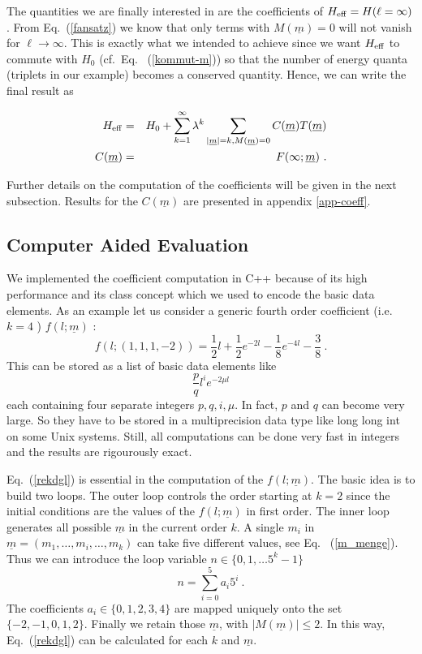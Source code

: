 The quantities we are finally interested in are the coefficients
of $H_{\rm eff}=H(\ell=\infty)$. From Eq.~(\ref{fansatz}) we know
that only terms with $M(\underline{m})=0$ will not vanish for
$\ell\to \infty$. This is exactly what we intended to achieve 
since we want $H_{\rm eff}$ to commute with $H_0$ (cf.~Eq.~
(\ref{kommut-m})) so that the
number of energy quanta (triplets in our example) becomes
a conserved quantity. Hence, we can write the final result as
\begin{mathletters}
\label{effhamilfin}
\begin{eqnarray}
H_{\rm eff} &=& H_0 +\sum_{k=1}^{\infty}\lambda^{k} 
\sum_{|\underline{m}|=k, M(\underline{m})=0} C(\underline{m}) 
T(\underline{m})\\
C(\underline{m}) &=& F(\infty;\underline{m})\ .
\end{eqnarray}
\end{mathletters}
Further details on the computation of the coefficients will be
given in the next subsection. Results for the $C(\underline{m})$
are presented in appendix \ref{app-coeff}.


\subsection{Computer Aided Evaluation}
We implemented the coefficient computation in C++ because of its high 
performance and its class concept which we used to encode the basic data 
elements. As an example let us
 consider a generic fourth order coefficient 
(i.e. $k=4$ ) $f(l;\underline{m})$ :
\begin{equation}
\label{fexample}
  f(l;(1,1,1,-2))=\frac{1}{2}l+\frac{1}{2}e^{-2l}-\frac{1}{8}e^{-4l}-
\frac{3}{8} \ .
\end{equation}
This can be stored as a list of basic data elements like
\begin{equation}
\label{basicdats}
 \frac{p}{q}l^ie^{-2\mu l}
\end{equation}
each containing four separate integers $p,q,i,\mu$. In fact, $p$ and $q$ 
can become very large. So they have to be stored in a multiprecision data 
type like long long int on some Unix systems. Still, all computations can 
be done very fast in integers and the results are rigourously exact.

Eq.~(\ref{rekdgl}) is essential in the computation of the $f(l;\underline{m})$.
 The basic idea is to build two loops. The outer loop controls the order 
starting at $k=2$ since the initial conditions are the values of the 
$f(l;\underline{m})$ in first order. The inner loop generates all possible 
$\underline{m}$ in the current order $k$. A single $m_i$ in 
$\underline{m}=(m_1,\ldots,m_i,\ldots,m_k)$ can take five different values,
see Eq.~ (\ref{m_menge}). Thus we can introduce the loop variable 
$n \in \{0,1,\ldots 5^k-1\}$ 
\begin{equation}
\label{5ersys}
  n=\sum_{i=0}^5 a_i5^i \ .
\end{equation}
The coefficients $a_i \in \{0,1,2,3,4 \}$ are mapped uniquely onto the set 
$\{-2,-1,0,1,2 \}$. Finally we retain those $\underline{m}$, with 
$|M(\underline{m})| \le 2$. In this way, Eq.~(\ref{rekdgl}) can be
 calculated for each $k$ and $\underline{m}$.

